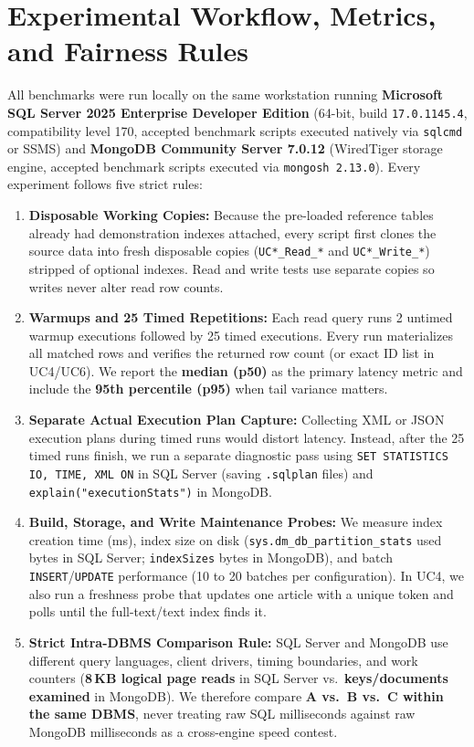 \section{Experimental Workflow, Metrics, and Fairness Rules}
All benchmarks were run locally on the same workstation running \textbf{Microsoft SQL Server 2025 Enterprise Developer Edition} (64-bit, build \texttt{17.0.1145.4}, compatibility level 170, accepted benchmark scripts executed natively via \texttt{sqlcmd} or SSMS) and \textbf{MongoDB Community Server 7.0.12} (WiredTiger storage engine, accepted benchmark scripts executed via \texttt{mongosh 2.13.0}). Every experiment follows five strict rules:
\begin{enumerate}
\item \textbf{Disposable Working Copies:} Because the pre-loaded reference tables already had demonstration indexes attached, every script first clones the source data into fresh disposable copies (\texttt{UC*\_Read\_*} and \texttt{UC*\_Write\_*}) stripped of optional indexes. Read and write tests use separate copies so writes never alter read row counts.
\item \textbf{Warmups and 25 Timed Repetitions:} Each read query runs 2 untimed warmup executions followed by 25 timed executions. Every run materializes all matched rows and verifies the returned row count (or exact ID list in UC4/UC6). We report the \textbf{median (p50)} as the primary latency metric and include the \textbf{95th percentile (p95)} when tail variance matters.
\item \textbf{Separate Actual Execution Plan Capture:} Collecting XML or JSON execution plans during timed runs would distort latency. Instead, after the 25 timed runs finish, we run a separate diagnostic pass using \texttt{SET STATISTICS IO, TIME, XML ON} in SQL Server (saving \texttt{.sqlplan} files) and \texttt{explain("executionStats")} in MongoDB.
\item \textbf{Build, Storage, and Write Maintenance Probes:} We measure index creation time (ms), index size on disk (\texttt{sys.dm\_db\_partition\_stats} used bytes in SQL Server; \texttt{indexSizes} bytes in MongoDB), and batch \texttt{INSERT}/\texttt{UPDATE} performance (10 to 20 batches per configuration). In UC4, we also run a freshness probe that updates one article with a unique token and polls until the full-text/text index finds it.
\item \textbf{Strict Intra-DBMS Comparison Rule:} SQL Server and MongoDB use different query languages, client drivers, timing boundaries, and work counters (\textbf{8\,KB logical page reads} in SQL Server vs.\ \textbf{keys/documents examined} in MongoDB). We therefore compare \textbf{A vs.\ B vs.\ C within the same DBMS}, never treating raw SQL milliseconds against raw MongoDB milliseconds as a cross-engine speed contest.
\end{enumerate}

